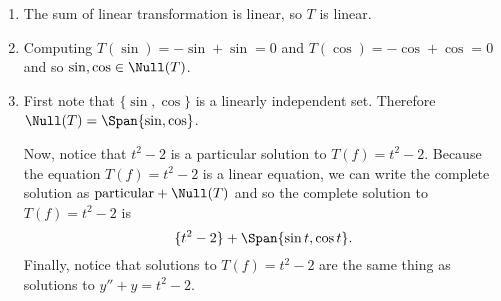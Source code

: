 \begin{enumerate}
\begin{enumerate}
			\item The sum of linear transformation is linear, so $T$ is linear.
			\item Computing $T(\sin) = -\sin+\sin=0$ and $T(\cos) = -\cos+\cos=0$ and so $\sin,\cos\in \Null(T)$.
			\item First note that $\{\sin,\cos\}$ is a linearly independent set. Therefore $\Null(T)=\Span\{\sin,\cos\}$.

			Now, notice that $t^2-2$ is a particular solution to $T(f)=t^2-2$. Because the equation $T(f)=t^2-2$ is a linear equation,
			we can write the complete solution as $\text{particular}+\Null(T)$ and so the complete solution to $T(f)=t^2-2$ is
			\[
				\{t^2-2\}+\Span\{\sin t,\cos t\}.
			\]
			Finally, notice that solutions to $T(f)=t^2-2$ are the same thing as solutions to $y''+y=t^2-2$.
		\end{enumerate}
\end{enumerate}
	
